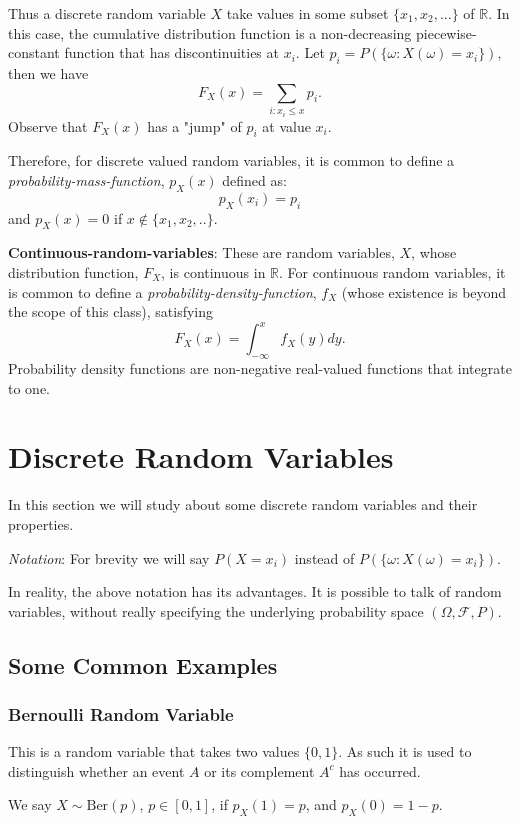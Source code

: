 Thus a discrete random variable $X$ take values in some subset $\{x_1, x_2, ...\}$ of $\mathbb{R}$. In this case, the cumulative distribution function is a non-decreasing piecewise-constant function that has discontinuities at $x_i$. Let $p_i = P(\{\omega:X(\omega)=x_i\})$, then we have
$$ F_X(x) = \sum_{i:x_i \leq x} p_i.$$
Observe that $F_X(x)$ has a "jump" of $p_i$ at value $x_i$.

Therefore, for discrete valued random variables, it is common to define a \textit{probability-mass-function}, $p_X(x)$ defined as:
$$ p_X(x_i) = p_i$$
and $p_X(x)=0 $ if $x \notin \{x_1,x_2,..\}.$


\textbf{Continuous-random-variables}: These are random variables, $X$, whose distribution function, $F_X$, is continuous in $\mathbb{R}$. For continuous random variables, it is common to define a \textit{probability-density-function}, $f_X$ (whose existence is beyond the scope of this class), satisfying
$$  F_X(x) = \int_{-\infty}^x f_X(y) dy.$$
Probability density functions are non-negative real-valued functions that integrate to one.

\section{Discrete Random Variables}
In this section we will study about some discrete random variables and their properties.

\textit{Notation}: For brevity we will say $P(X=x_i)$ instead of $P(\{\omega: X(\omega)=x_i\})$.

\begin{remark}
In reality, the above notation has its advantages. It is possible to talk of random variables, without really specifying the underlying probability space $(\Omega,\mathcal{F},P)$.
\end{remark}

\subsection{Some Common Examples}

\subsubsection{Bernoulli Random Variable} This is a random variable that takes two values $\{0,1\}$. As such it is used to distinguish whether an event $A$ or its complement $A^c$ has occurred.

We say $X \sim \textrm{Ber}(p)$, $p \in [0,1]$, if $p_X(1)=p$, and $p_X(0)=1-p.$

